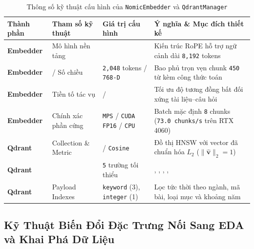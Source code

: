 \begin{table}[htbp]
  \centering
  \small
  \caption[Thông số kỹ thuật của NomicEmbedder và QdrantManager]{Thông số kỹ thuật cấu hình của \texttt{NomicEmbedder} và \texttt{QdrantManager}}
  \label{tab:ch2_embed_qdrant_params}
  \setlength{\tabcolsep}{3.5pt}
  \begin{tabularx}{\linewidth}{|>{\raggedright\arraybackslash}p{22mm}|>{\raggedright\arraybackslash}p{36mm}|>{\raggedright\arraybackslash}p{38mm}|L|}
    \hline
    \textbf{Thành phần} & \textbf{Tham số kỹ thuật} & \textbf{Giá trị cấu hình} & \textbf{Ý nghĩa \& Mục đích thiết kế} \\
    \hline
    \textbf{Embedder} & Mô hình nền tảng &  & Kiến trúc RoPE hỗ trợ ngữ cảnh dài \texttt{8,192} tokens \\
    \hline
    \textbf{Embedder} &  / Số chiều & \texttt{2,048} tokens / \texttt{768-D} & Bao phủ trọn vẹn chunk \texttt{450} từ kèm công thức toán \\
    \hline
    \textbf{Embedder} & Tiền tố tác vụ &  /  & Tối ưu độ tương đồng bất đối xứng tài liệu--câu hỏi \\
    \hline
    \textbf{Embedder} & Chính xác phần cứng & \texttt{MPS} / \texttt{CUDA FP16} / \texttt{CPU} & Batch mặc định \texttt{8} chunks (\texttt{73.0 chunks/s} trên RTX 4060) \\
    \hline
    \textbf{Qdrant} & Collection \& Metric &  / \texttt{Cosine} & Đồ thị HNSW với vector đã chuẩn hóa $L_2$ ($\|\hat{\mathbf{v}}\|_2 = 1$) \\
    \hline
    \textbf{Qdrant} &  & \texttt{5} trường tối thiểu & , , , ,  \\
    \hline
    \textbf{Qdrant} & Payload Indexes & \texttt{keyword} (3), \texttt{integer} (1) & Lọc tức thời theo ngành, mã bài, loại mục và khoảng năm \\
    \hline
  \end{tabularx}
\end{table}

\subsection{Kỹ Thuật Biến Đổi Đặc Trưng Nối Sang EDA và Khai Phá Dữ Liệu}
\label{sec:ch2_feature_eng}

